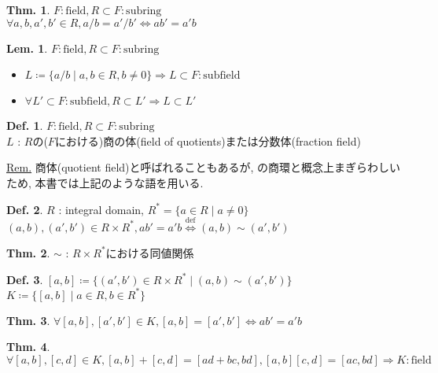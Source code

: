 \documentclass[uplatex,dvipdfmx,9pt]{beamer}
\newcommand{\defarrow}{\overset{\mathrm{def}}{\Leftrightarrow}}
\newcounter{textLemCount}
\theoremstyle{definition} %
\newtheorem{defn}{Def.}[subsection] %
\newtheorem{thm}{Thm.}[subsection] %
\newtheorem{lemText}[textLemCount]{Lem.} %
\theoremstyle{example}
\begin{document}
    \begin{frame}

      \begin{thm}
        $F : \text{field}, R \subset F : \text{subring}$ \\
        $\forall a, b, a', b' \in R, a/b = a'/b' \Leftrightarrow ab' = a'b$
      \end{thm}

      \begin{lemText}
        $F : \text{field}, R \subset F : \text{subring}$ \\
        \begin{itemize}
          \item $L \coloneqq \{a/b \mid a,b \in R, b \neq 0\} \Rightarrow L \subset F : \text{subfield}$ 
          \item $\forall L' \subset F : \text{subfield}, R \subset L' \Rightarrow L \subset L'$
        \end{itemize}
      \end{lemText}

      \begin{defn}
        $F : \text{field}, R \subset F : \text{subring}$ \\
        $L$ : $R$の($F$における)\alert{商の体(field of quotients)}または\alert{分数体(fraction field)}
      \end{defn}
      \underline{Rem.} 商体(quotient field)と呼ばれることもあるが,  の商環と概念上まぎらわしいため, 本書では上記のような語を用いる.
      
    \end{frame}

    \begin{frame}

      \begin{defn}
        $R$ : integral domain, $R^* = \{ a \in R \mid a \neq 0\}$ \\
        $(a, b), (a', b') \in R \times R^*, ab' = a'b \defarrow (a, b) \sim (a', b')$
      \end{defn}

      \begin{thm}
        $\sim$ : $R \times R^*$における同値関係
      \end{thm}

      \begin{defn}
        $[a, b] \coloneqq \{(a', b') \in R \times R^* \mid (a, b) \sim (a', b')\}$ \\
        $K \coloneqq \{[a, b] \mid a \in R, b \in R^*\}$
      \end{defn}

      \begin{thm}
        $\forall [a, b], [a', b'] \in K, [a, b] = [a', b'] \Leftrightarrow ab' = a'b$
      \end{thm}

      \begin{thm}
        $\forall [a, b], [c, d] \in K, [a, b] + [c, d] = [ad + bc, bd], [a, b][c, d] = [ac, bd] \Rightarrow K : \text{field}$
      \end{thm}
      
    \end{frame}
\end{document}
